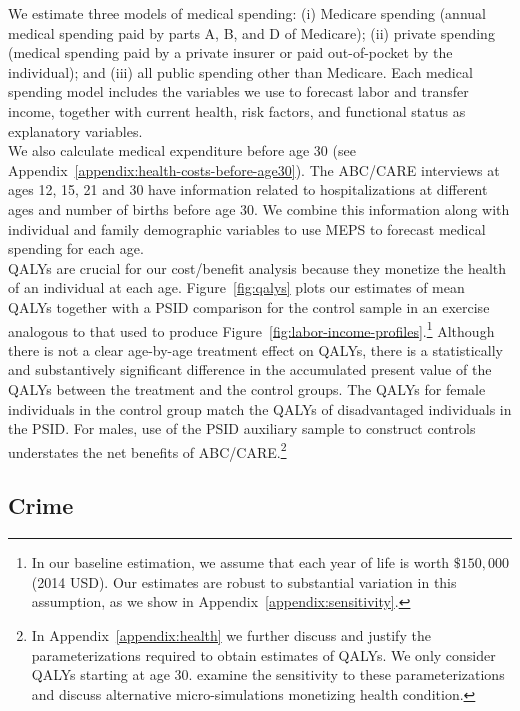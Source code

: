 \noindent We estimate three models of medical spending: (i) Medicare spending (annual medical spending paid by parts A, B, and D of Medicare); (ii) private spending (medical spending paid by a private insurer or paid out-of-pocket by the individual); and (iii) all public spending other than Medicare. Each medical spending model includes the variables we use to forecast labor and transfer income, together with current health, risk factors, and functional status as explanatory variables.\\

\noindent We also calculate medical expenditure before age 30 (see Appendix~\ref{appendix:health-costs-before-age30}). The ABC/CARE interviews at ages 12, 15, 21 and 30 have information related to hospitalizations at different ages and number of births before age 30. We combine this information along with individual and family demographic variables to use MEPS to forecast medical spending for each age.\\

\noindent QALYs are crucial for our cost/benefit analysis because they monetize the health of an individual at each age. Figure~\ref{fig:qalys} plots our estimates of mean QALYs together with a PSID comparison for the control sample in an exercise analogous to that used to produce Figure~\ref{fig:labor-income-profiles}.\footnote{In our baseline estimation, we assume that each year of life is worth  $\$150,000$ (2014 USD). Our estimates are robust to substantial variation in this assumption, as we show in  Appendix~\ref{appendix:sensitivity}.} Although there is not a clear age-by-age treatment effect on QALYs, there is a statistically and substantively significant difference in the accumulated present value of the QALYs between the treatment and the control groups. The QALYs for female individuals in the control group match the QALYs of disadvantaged individuals in the PSID. For males, use of the PSID auxiliary sample to construct controls understates the net benefits of ABC/CARE.\footnote{In  Appendix~\ref{appendix:health} we further discuss and justify the parameterizations required to obtain estimates of QALYs. We only consider QALYs starting at age 30. \citet{Goldman_etal_2015_Future-America-Model} examine the sensitivity to these parameterizations and discuss alternative micro-simulations monetizing health condition.}

\subsection{Crime}

